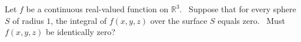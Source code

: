 Let $f$ be a continuous real-valued function on $\mathbb R^3$.  Suppose that for every sphere $S$ of radius $1$, the integral of $f(x,y,z)$ over the surface $S$ equals zero.  Must $f(x,y,z)$ be identically zero?
